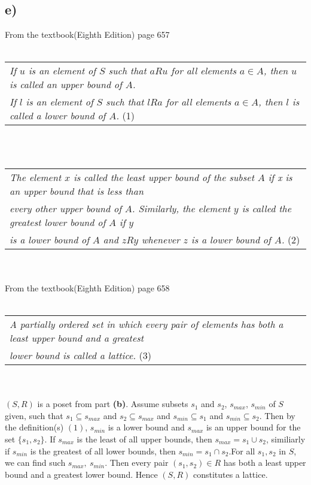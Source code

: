 \documentclass[11pt]{article}
\begin{document}
\subsection*{e)}
From the textbook(Eighth Edition) page 657
\\ \\
\begin{tabular}{l}
    \textit{If $u$ is an element of $S$ such that $aRu$ for all elements $a \in A$, then $u$ is called an upper bound of $A$.} \\
    \textit{If $l$ is an element of $S$ such that $lRa$ for all elements $a\in A$, then $l$ is called a lower bound of $A$.} (1)
\end{tabular}
\\ \\
\begin{tabular}{l}
    \textit{The element $x$ is called the least upper bound of the subset $A$ if x is an upper bound that is less than} \\
    \textit{every other upper bound of $A$. Similarly, the element $y$ is called the greatest lower bound of $A$ if $y$} \\
    \textit{is a lower bound of $A$ and $zRy$ whenever $z$ is a lower bound of $A$.} (2)
\end{tabular}
\\ \\
From the textbook(Eighth Edition) page 658
\\ \\
\begin{tabular}{l}
    \textit{A partially ordered set in which every pair of elements has both a least upper bound and a greatest} \\
    \textit{lower bound is called a lattice.} (3)
\end{tabular}
\\ \\
$(S,R)$ is a poset from part \textbf{(b)}. Assume subsets $s_1$ and $s_2$, $s_{max}$, $s_{min}$ 
of $S$ given, such that $s_1 \subseteq s_{max}$ and $s_2 \subseteq s_{max}$ and $s_{min} \subseteq s_1$ 
and $s_{min} \subseteq s_2$. Then by the definition(s) $(1)$, $s_{min}$ is a lower bound and $s_{max}$ 
is an upper bound for the set $\{s_1, s_2\}$. If $s_{max}$ is the least of all upper bounds, 
then $s_{max}=s_1 \cup s_2$, similiarly if $s_{min}$ is the greatest of all lower bounds, then 
$s_{min}=s_1 \cap s_2$.For all $s_1, s_2$ in $S$, we can find such $s_{max},\ s_{min}$. Then every 
pair $(s_1,s_2) \in R$ has both a least upper bound and a greatest lower bound. Hence $(S,R)$ 
constitutes a lattice.
\end{document}
